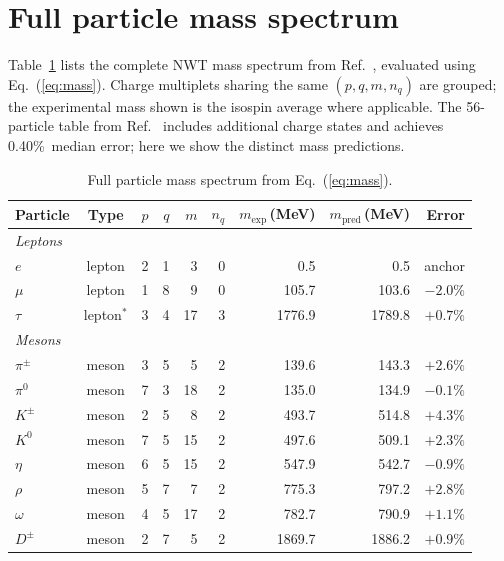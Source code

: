 \documentclass[11pt]{article}
\begin{document}
\appendix
\section{Full particle mass spectrum}
\label{app:full_table}

Table~\ref{tab:full} lists the complete NWT mass spectrum from
Ref.~\cite{NWT6}, evaluated using Eq.~(\ref{eq:mass}).  Charge
multiplets sharing the same $(p,q,m,n_q)$ are grouped; the
experimental mass shown is the isospin average where applicable.
The 56-particle table from Ref.~\cite{NWT6} includes additional
charge states and achieves 0.40\%~median error; here we show the
distinct mass predictions.

\begin{table}[h!]
\centering
\caption{Full particle mass spectrum from Eq.~(\ref{eq:mass}).}
\label{tab:full}
\smallskip
\small
\begin{tabular}{lcrrrrrrr}
\toprule
Particle & Type & $p$ & $q$ & $m$ & $n_q$
    & $m_\mathrm{exp}$\,(MeV) & $m_\mathrm{pred}$\,(MeV) & Error \\
\midrule
\multicolumn{9}{l}{\textit{Leptons}} \\
$e$            & lepton & 2 & 1 &  3 & 0 &     0.5 &     0.5 & anchor \\
$\mu$          & lepton & 1 & 8 &  9 & 0 &   105.7 &   103.6 & $-2.0\%$ \\
$\tau$         & lepton$^*$ & 3 & 4 & 17 & 3 &  1776.9 &  1789.8 & $+0.7\%$ \\
\midrule
\multicolumn{9}{l}{\textit{Mesons}} \\
$\pi^{\pm}$    & meson  & 3 & 5 &  5 & 2 &   139.6 &   143.3 & $+2.6\%$ \\
$\pi^0$        & meson  & 7 & 3 & 18 & 2 &   135.0 &   134.9 & $-0.1\%$ \\
$K^{\pm}$      & meson  & 2 & 5 &  8 & 2 &   493.7 &   514.8 & $+4.3\%$ \\
$K^0$          & meson  & 7 & 5 & 15 & 2 &   497.6 &   509.1 & $+2.3\%$ \\
$\eta$         & meson  & 6 & 5 & 15 & 2 &   547.9 &   542.7 & $-0.9\%$ \\
$\rho$         & meson  & 5 & 7 &  7 & 2 &   775.3 &   797.2 & $+2.8\%$ \\
$\omega$       & meson  & 4 & 5 & 17 & 2 &   782.7 &   790.9 & $+1.1\%$ \\
$D^{\pm}$      & meson  & 2 & 7 &  5 & 2 &  1869.7 &  1886.2 & $+0.9\%$ \\

\end{tabular}
\end{table}
\end{document}

